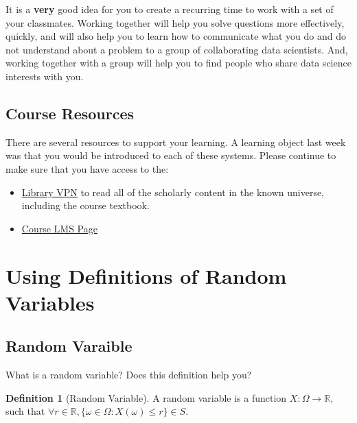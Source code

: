 \documentclass[
]{book}
\providecommand{\tightlist}{%
  \setlength{\itemsep}{0pt}\setlength{\parskip}{0pt}}
\theoremstyle{definition}
\newtheorem{definition}{Definition}[chapter]
\theoremstyle{definition}
\theoremstyle{definition}
\theoremstyle{definition}
\theoremstyle{remark}
\begin{document}
It is a \textbf{very} good idea for you to create a recurring time to work with a set of your classmates. Working together will help you solve questions more effectively, quickly, and will also help you to learn how to communicate what you do and do not understand about a problem to a group of collaborating data scientists. And, working together with a group will help you to find people who share data science interests with you.

\hypertarget{course-resources}{%
\subsection*{Course Resources}\label{course-resources}}

There are several resources to support your learning. A learning object last week was that you would be introduced to each of these systems. Please continue to make sure that you have access to the:

\begin{itemize}
\tightlist
\item
  \href{https://www.lib.berkeley.edu/using-the-libraries/vpn}{Library VPN} to read all of the scholarly content in the known universe, including the course textbook.
\item
  \href{https://www.bcourses.berkeley.edu}{Course LMS Page}
\end{itemize}

\hypertarget{using-definitions-of-random-variables}{%
\section{Using Definitions of Random Variables}\label{using-definitions-of-random-variables}}

\hypertarget{random-varaible}{%
\subsection{Random Varaible}\label{random-varaible}}

What is a random variable? Does this definition help you?

\begin{definition}[Random Variable]
A random variable is a function \(X : \Omega \rightarrow \mathbb{R},\) such that \(\forall r \in \mathbb{R}, \{\omega \in \Omega: X(\omega) \leq r\} \in S\).
\end{definition}
\end{document}
